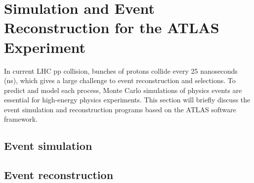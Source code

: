 \chapter{Simulation and Event Reconstruction for the ATLAS Experiment}

In current LHC pp collision, bunches of protons collide every 25 nanoseconds (ns), which gives a large challenge to event reconstruction and selections.
To predict and model each process, Monte Carlo simulations of physics events are essential for high-energy physics experiments.
This section will briefly discuss the event simulation and reconstruction programs based on the ATLAS software framework. 

\section{Event simulation}
\label{sec:simulation_framework}


\section{Event reconstruction}
\label{sec:reconstruction}

